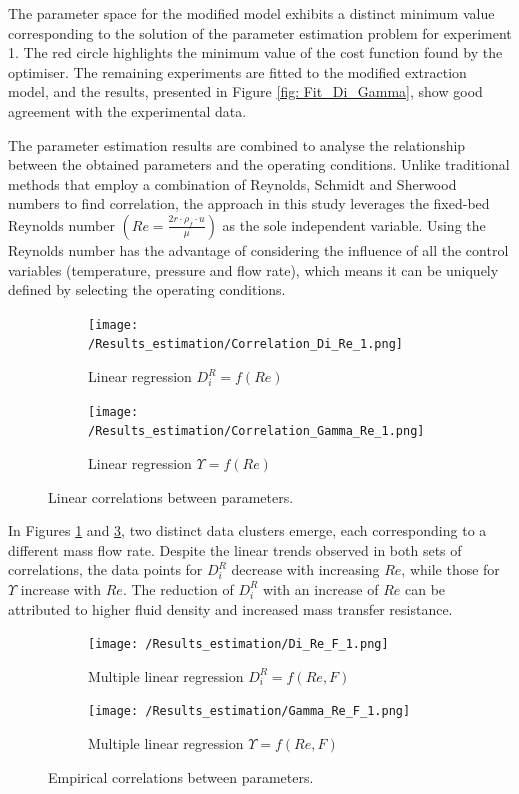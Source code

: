 \documentclass[a4paper,fleqn]{cas-dc}
\begin{document}
The parameter space for the modified model exhibits a distinct minimum value corresponding to the solution of the parameter estimation problem for experiment 1. The red circle highlights the minimum value of the cost function found by the optimiser. The remaining experiments are fitted to the modified extraction model, and the results, presented in Figure \ref{fig: Fit_Di_Gamma}, show good agreement with the experimental data. 

The parameter estimation results are combined to analyse the relationship between the obtained parameters and the operating conditions. Unlike traditional methods that employ a combination of Reynolds, Schmidt and Sherwood numbers to find correlation, the approach in this study leverages the fixed-bed Reynolds number $\left(Re = \frac{2r \cdot \rho_f \cdot u}{\mu}\right)$ as the sole independent variable. Using the Reynolds number has the advantage of considering the influence of all the control variables (temperature, pressure and flow rate), which means it can be uniquely defined by selecting the operating conditions.	

\begin{figure}[!h]
	\centering
	\begin{subfigure}{0.9\columnwidth}
		\centering
		\texttt{[image: /Results\_estimation/Correlation\_Di\_Re\_1.png]}
		\caption{Linear regression $D_i^R = f(Re)$}
		\label{fig: Correlations_Di_Re}
	\end{subfigure}
	\hfill
	\begin{subfigure}{0.9\columnwidth}
		\centering
		\texttt{[image: /Results\_estimation/Correlation\_Gamma\_Re\_1.png]}
		\caption{Linear regression $\Upsilon = f(Re)$}
		\label{fig: Correlations_Gamma_Re}
	\end{subfigure}
	\caption{Linear correlations between parameters.}
\end{figure}

In Figures \ref{fig: Correlations_Di_Re} and \ref{fig: Correlations_Gamma_Re}, two distinct data clusters emerge, each corresponding to a different mass flow rate. Despite the linear trends observed in both sets of correlations, the data points for $D_i^R$ decrease with increasing $Re$, while those for $\Upsilon$ increase with $Re$. The reduction of $D_i^R$ with an increase of $Re$ can be attributed to higher fluid density and increased mass transfer resistance.

\begin{figure}[!h]
	\centering
	\begin{subfigure}{0.9\columnwidth}
		\centering
		\texttt{[image: /Results\_estimation/Di\_Re\_F\_1.png]}
		\caption{Multiple linear regression $D_i^R = f(Re, F)$}
		\label{fig: Correlations_Di_Re_F}
	\end{subfigure}
	\hfill
	\begin{subfigure}{0.9\columnwidth}
		\centering
		\texttt{[image: /Results\_estimation/Gamma\_Re\_F\_1.png]}
		\caption{Multiple linear regression $\Upsilon = f(Re, F)$}
		\label{fig: Correlations_Gamma_Re_F}
	\end{subfigure}
	\caption{Empirical correlations between parameters.}
\end{figure}
\end{document}
